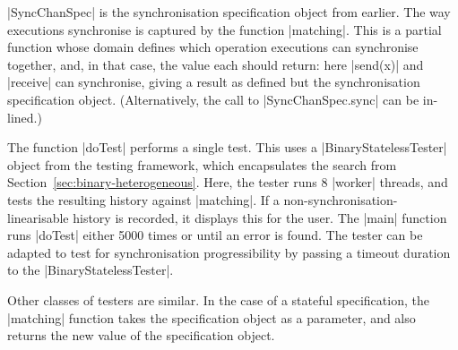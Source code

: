 |SyncChanSpec| is the synchronisation specification object from earlier.  The
way executions synchronise is captured by the function |matching|.  This is a
partial function whose domain defines which operation executions can
synchronise together, and, in that case, the value each should return: here
|send(x)| and |receive| can synchronise, giving a result as defined but the
synchronisation specification object.  (Alternatively, the call to
|SyncChanSpec.sync| can be in-lined.)

The function |doTest| performs a single test.  This uses a
|BinaryStatelessTester| object from the testing framework, which encapsulates
the search from Section~\ref{sec:binary-heterogeneous}.  Here, the tester runs
8 |worker| threads, and tests the resulting history against |matching|.  If a
non-synchronisation-linearisable history is recorded, it displays this for the
user.  The |main| function runs |doTest| either 5000 times or until an error
is found.  The tester can be adapted to test for synchronisation
progressibility by passing a timeout duration to the |BinaryStatelessTester|.

Other classes of testers are similar.  In the case of a stateful
specification, the |matching| function takes the specification object as a
parameter, and also returns the new value of the specification object.

